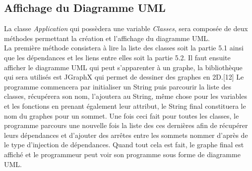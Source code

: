 \documentclass{article}
\begin{document}
\subsection{Affichage du Diagramme UML}
La classe \emph{Application} qui possèdera une variable \emph{Classes}, sera composée de deux méthodes permettant la création et l'affichage du diagramme UML.\\
La première méthode consistera à lire la liste des classes soit la partie 5.1 ainsi que les dépendances et les liens entre elles soit la partie 5.2. %
Il faut ensuite afficher le diagramme UML qui peut s'apparenter à un graphe, la bibliothèque qui sera utilisés est JGraphX qui permet de dessiner des graphes en 2D.[12] Le programme commencera par initialiser un String puis parcourir la liste des classes, récupérera son nom, l'ajoutera au String, même chose pour les variables et les fonctions en prenant également leur attribut, le String final constituera le nom du graphes pour un sommet. Une fois ceci fait pour toutes les classes, le programme parcours une nouvelle fois la liste des ces dernières afin de récupérer leurs dépendances et d'ajouter des arrêtes entre les sommets nommer d'après de le type d'injection de dépendances. Quand tout cela est fait, le graphe final est affiché et le programmeur peut voir son programme sous forme de diagramme UML.
\end{document}
